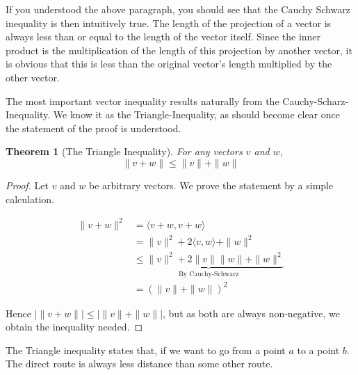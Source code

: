 \documentclass{report}
\newtheorem{theorem}{Theorem}[chapter]
\begin{document}
If you understood the above paragraph, you should see that the Cauchy Schwarz inequality is then intuitively true. The length of the projection of a vector is always less than or equal to the length of the vector itself. Since the inner product is the multiplication of the length of this projection by another vector, it is obvious that this is less than the original vector's length multiplied by the other vector.

The most important vector inequality results naturally from the Cauchy-Scharz-Inequality. We know it as the Triangle-Inequality, as should become clear once the statement of the proof is understood.

\begin{theorem}[The Triangle Inequality]
  For any vectors $v$ and $w$,
  \[ \| v + w \| \leq \| v \| + \| w \| \]
\end{theorem}

\begin{proof}
  Let $v$ and $w$ be arbitrary vectors. We prove the statement by a simple calculation.

  \begin{align*}
    \| v + w \|^2 &= \langle v + w, v + w \rangle\\
                  &= \|v\|^2 + 2\langle v,w \rangle + \|w\|^2\\
                  &\underbrace{\leq \|v\|^2 + 2\|v\|\|w\| + \|w\|^2}_\text{By Cauchy-Schwarz}\\
                  &= (\|v\| + \|w\|)^2
  \end{align*}

  Hence $| \| v + w \| | \leq |\|v\| + \|w\| |$, but as both are always non-negative, we obtain the inequality needed.
\end{proof}

\begin{center}
\end{center}

The Triangle inequality states that, if we want to go from a point $a$ to a point $b$. The direct route is always less distance than some other route.
\end{document}
